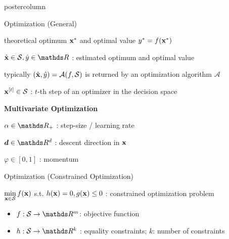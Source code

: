 \documentclass[11pt,compress,t,notes=noshow, xcolor=table]{beamer}
\begin{document}
\begin{frame}[fragile]{}
\begin{columns}
\begin{column}{.31\textwidth}
\begin{beamercolorbox}[center]{postercolumn}
\begin{minipage}{.98\textwidth}
{\begin{myblock}{Optimization (General)}
\begin{codebox}
						\end{codebox}
						\hspace*{1ex} theoretical optimum $\mathbf{x}^\ast$ and optimal value $y^\ast = f(\mathbf{x}^\ast)$ \\
						\begin{codebox}
							 $\hat\xv \in \mathcal{S}, \hat y \in \R$ : estimated optimum and optimal value
						\end{codebox}
						\hspace*{1ex} typically $(\hat{\mathbf{x}}, \hat y) = \mathcal{A}(f,\mathcal{S})$ is returned by an optimization algorithm $\mathcal{A}$ \\
						\begin{codebox}
							 $\mathbf{x}^{[t]} \in \mathcal{S}$ : $t$-th step of an optimizer in the decision space
						\end{codebox}
						\vspace*{2ex} \textbf{Multivariate Optimization}\\
							\begin{codebox}
								 $\alpha \in \R_+$ : step-size / learning rate
							\end{codebox}
							\hspace*{1ex}
							\begin{codebox}
								 $\bm{d} \in \R^d$ : descent direction in $\mathbf{x}$
							\end{codebox}
							\hspace*{1ex}
							\begin{codebox}
								 $\varphi \in [0, 1]$ : momentum
							\end{codebox}
						\end{myblock}	
					\begin{myblock}{Optimization (Constrained Optimization)}
					\begin{codebox}
							$\min\limits_{\mathbf{x} \in \mathcal{S}} f(\mathbf{x})$ s.t. $h(\mathbf{x}) = 0, g(\mathbf{x}) \le 0$ : constrained optimization problem
						\end{codebox}
						\begin{itemize}
							\item \quad $f: \mathcal{S} \to \R^m$: objective function
							\item \quad $h: \mathcal{S} \to \R^k$ : equality constraints; $k$: number of constraints\\

\end{itemize}
\end{myblock}}
\end{minipage}
\end{beamercolorbox}
\end{column}
\end{columns}
\end{frame}
\end{document}
